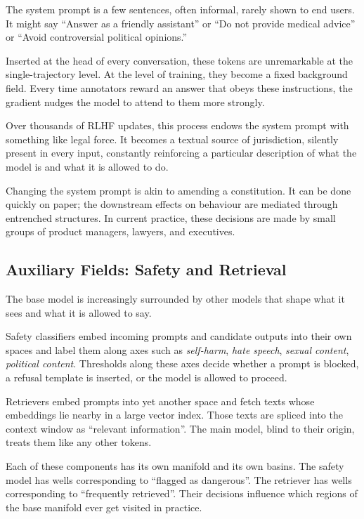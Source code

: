 \documentclass[12pt,a4paper]{article}
\begin{document}
The system prompt is a few sentences, often informal, rarely shown to end users. It might say ``Answer as a friendly assistant'' or ``Do not provide medical advice'' or ``Avoid controversial political opinions.''

Inserted at the head of every conversation, these tokens are unremarkable at the single-trajectory level. At the level of training, they become a fixed background field. Every time annotators reward an answer that obeys these instructions, the gradient nudges the model to attend to them more strongly.

Over thousands of RLHF updates, this process endows the system prompt with something like legal force. It becomes a textual source of jurisdiction, silently present in every input, constantly reinforcing a particular description of what the model is and what it is allowed to do.

Changing the system prompt is akin to amending a constitution. It can be done quickly on paper; the downstream effects on behaviour are mediated through entrenched structures. In current practice, these decisions are made by small groups of product managers, lawyers, and executives.

\subsection{Auxiliary Fields: Safety and Retrieval}

The base model is increasingly surrounded by other models that shape what it sees and what it is allowed to say.

Safety classifiers embed incoming prompts and candidate outputs into their own spaces and label them along axes such as \emph{self-harm}, \emph{hate speech}, \emph{sexual content}, \emph{political content}. Thresholds along these axes decide whether a prompt is blocked, a refusal template is inserted, or the model is allowed to proceed.

Retrievers embed prompts into yet another space and fetch texts whose embeddings lie nearby in a large vector index. Those texts are spliced into the context window as ``relevant information''. The main model, blind to their origin, treats them like any other tokens.

Each of these components has its own manifold and its own basins. The safety model has wells corresponding to ``flagged as dangerous''. The retriever has wells corresponding to ``frequently retrieved''. Their decisions influence which regions of the base manifold ever get visited in practice.
\end{document}
